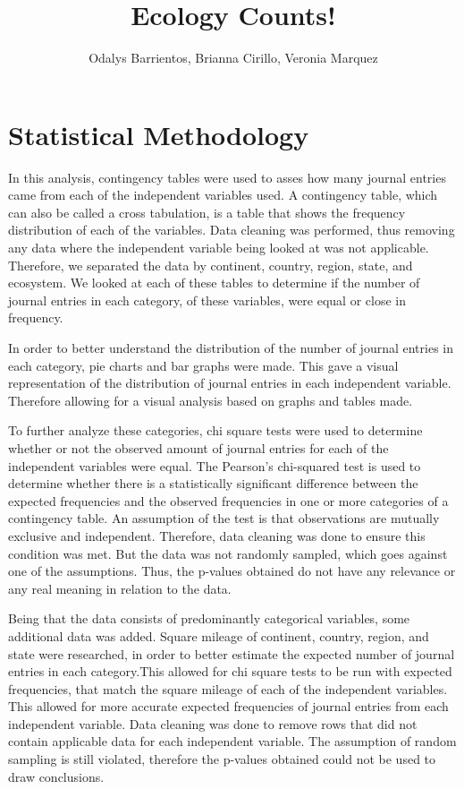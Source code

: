 \documentclass[
]{article}
\title{Ecology Counts!}
\author{Odalys Barrientos, Brianna Cirillo, Veronia Marquez}
\date{}
\begin{document}
\maketitle

\hypertarget{statistical-methodology}{%
\section{Statistical Methodology}\label{statistical-methodology}}

In this analysis, contingency tables were used to asses how many journal
entries came from each of the independent variables used. A contingency
table, which can also be called a cross tabulation, is a table that
shows the frequency distribution of each of the variables. Data cleaning
was performed, thus removing any data where the independent variable
being looked at was not applicable. Therefore, we separated the data by
continent, country, region, state, and ecosystem. We looked at each of
these tables to determine if the number of journal entries in each
category, of these variables, were equal or close in frequency.

In order to better understand the distribution of the number of journal
entries in each category, pie charts and bar graphs were made. This gave
a visual representation of the distribution of journal entries in each
independent variable. Therefore allowing for a visual analysis based on
graphs and tables made.

To further analyze these categories, chi square tests were used to
determine whether or not the observed amount of journal entries for each
of the independent variables were equal. The Pearson's chi-squared test
is used to determine whether there is a statistically significant
difference between the expected frequencies and the observed frequencies
in one or more categories of a contingency table. An assumption of the
test is that observations are mutually exclusive and independent.
Therefore, data cleaning was done to ensure this condition was met. But
the data was not randomly sampled, which goes against one of the
assumptions. Thus, the p-values obtained do not have any relevance or
any real meaning in relation to the data.

Being that the data consists of predominantly categorical variables,
some additional data was added. Square mileage of continent, country,
region, and state were researched, in order to better estimate the
expected number of journal entries in each category.This allowed for chi
square tests to be run with expected frequencies, that match the square
mileage of each of the independent variables. This allowed for more
accurate expected frequencies of journal entries from each independent
variable. Data cleaning was done to remove rows that did not contain
applicable data for each independent variable. The assumption of random
sampling is still violated, therefore the p-values obtained could not be
used to draw conclusions.
\end{document}
